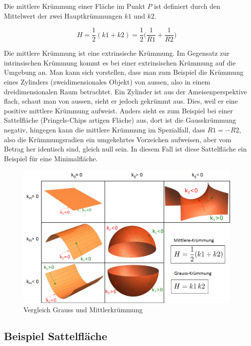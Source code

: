 \begin{refsection}

Die mittlere Krümmung einer Fläche im Punkt $P$ ist definiert durch den Mittelwert der zwei Hauptkrümmungen $k1$ und $k2$.

\begin{equation} \label{Mittlere Kruemmung_D}
  H=\frac{1}{2}(k1+k2)= \frac{1}{2}\bigg(\frac{1}{R1}+\frac{1}{R2}\bigg)
\end{equation}

Die mittlere Krümmung ist eine extrinsische Krümmung. 
Im Gegensatz zur intrinsischen Krümmung kommt es bei einer extrinsischen Krümmung auf die Umgebung an. 
Man kann sich vorstellen, dass man zum Beispiel die Krümmung eines Zylinders (zweidimensionales Objekt) von aussen, also in einem dreidimensionalen Raum betrachtet. 
Ein Zylinder ist aus der Ameisenperspektive flach, schaut man von aussen, sieht er jedoch gekrümmt aus.
Dies, weil er eine positive mittlere Krümmung aufweist. 
Anders sieht es zum Beispiel bei einer Sattelfläche (Pringels-Chips artigen Fläche) aus, dort ist die Gausskrümmung negativ, hingegen kann die mittlere Krümmung im Spezialfall, dass $R1=-R2$, also die Krümmungsradien ein umgekehrtes Vorzeichen aufweisen, aber vom Betrag her identisch sind, gleich null sein. 
In diesem Fall ist diese Sattelfläche ein Beispiel für eine Minimalfläche.

\begin{figure} 
  \centering
  \includegraphics[scale=0.4]{minimal/Tabelle_Kruemmung.png}
  \caption{Vergleich Grauss und Mittlerkrümmung} 
\end{figure}


\subsection{Beispiel Sattelfläche}

\end{refsection}
